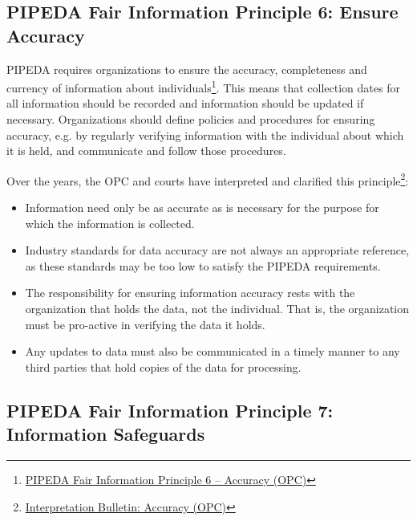 \subsection*{PIPEDA Fair Information Principle 6: Ensure Accuracy}

PIPEDA requires organizations to ensure the accuracy, completeness and currency of information about individuals\footnote{\href{https://www.priv.gc.ca/en/privacy-topics/privacy-laws-in-canada/the-personal-information-protection-and-electronic-documents-act-pipeda/p_principle/principles/p_accuracy/}{PIPEDA Fair Information Principle 6 -- Accuracy (OPC)}}. This means that collection dates for all information should be recorded and information should be updated if necessary. Organizations should define policies and procedures for ensuring accuracy, e.g. by regularly verifying information with the individual about which it is held, and communicate and follow those procedures. 

Over the years, the OPC and courts have interpreted and clarified this principle\footnote{\href{https://www.priv.gc.ca/en/privacy-topics/privacy-laws-in-canada/the-personal-information-protection-and-electronic-documents-act-pipeda/pipeda-compliance-help/pipeda-interpretation-bulletins/interpretations_04_accuracy/}{Interpretation Bulletin: Accuracy (OPC)}}:
\begin{itemize}
\item Information need only be as accurate as is necessary for the purpose for which the information is collected. 
\item Industry standards for data accuracy are not always an appropriate reference, as these standards may be too low to satisfy the PIPEDA requirements. 
\item The responsibility for ensuring information accuracy rests with the organization that holds the data, not the individual. That is, the organization must be pro-active in verifying the data it holds. \item Any updates to data must also be communicated in a timely manner to any third parties that hold copies of the data for processing. 
\end{itemize}

\subsection*{PIPEDA Fair Information Principle 7: Information Safeguards}

